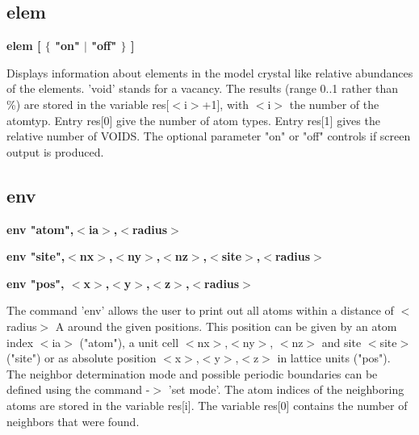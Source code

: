 \subsection*{elem}
{\bf elem [ $ \{$ "on" $| $ "off" $\} $ ] \par }
\par
\vspace{3pt}
Displays information about elements in the model crystal like 
relative abundances of the elements. 'void' stands for a vacancy. 
The results (range 0..1 rather than \%) are stored in the variable 
res[$ <$i$> $+1], with $ <$i$> $ the number of the atomtyp. 
Entry res[0] give the number of atom types. 
Entry res[1] gives the relative number of VOIDS. 
The optional parameter "on" or "off" controls if screen 
output is produced. 
\subsection*{env}
{\bf env "atom",$ <$ia$> $,$ <$radius$> $ \par }
{\bf env "site",$ <$nx$> $,$ <$ny$> $,$ <$nz$> $,$ <$site$> $,$ <$radius$> $ \par }
{\bf env "pos", $ <$x$> $,$ <$y$> $,$ <$z$> $,$ <$radius$> $ \par }
\par
\vspace{3pt}
The command 'env' allows the user to print out all atoms within 
a distance of $ <$radius$> $ A around the given positions. This position 
can be given by an atom index $ <$ia$> $ ("atom"), a unit cell $ <$nx$> $,$ <$ny$> $, 
$ <$nz$> $ and site $ <$site$> $ ("site") or as absolute position $ <$x$> $,$ <$y$> $,$ <$z$> $ 
in lattice units ("pos"). The neighbor determination mode and 
possible periodic boundaries can be defined using the command 
-$> $ 'set mode'. The atom indices of the neighboring atoms are 
stored in the variable res[i]. The variable res[0] contains the 
number of neighbors that were found. 
